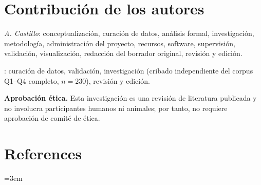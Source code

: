 \nolinenumbers

\section*{Contribución de los autores}
\noindent\textit{A. Castillo}: conceptualización, curación de datos, análisis
formal, investigación, metodología, administración del proyecto, recursos,
software, supervisión, validación, visualización, redacción del borrador
original, revisión y edición.

\smallskip
\noindent\textit{\NombreCoRevisor}: curación de datos, validación,
investigación (cribado independiente del corpus Q1--Q4 completo,
$n=230$), revisión y edición.

\bigskip
\noindent\textbf{Aprobación ética.}
Esta investigación es una revisión de literatura publicada y no involucra
participantes humanos ni animales; por tanto, no requiere aprobación de
comité de ética.

\bigskip

\section*{References}
\setlength{\parindent}{0pt}
\begingroup
\emergencystretch=3em
\begin{refcontext}[sorting=nyt]
\printbibliography[heading=none]
\end{refcontext}
\endgroup
\linenumbers

